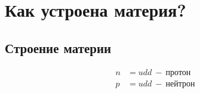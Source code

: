 \documentclass[a4paper,12pt]{report}
\begin{document}
    \tableofcontents
    \newpage

    \section{Как устроена материя?}
    \subsection{Строение материи}
        \begin{align*}
            n&=udd\  -\  \text{протон}\\
            p&=udd\  -\  \text{нейтрон}
        \end{align*}
        \begin{figure}
            \begin{table}
                
            \end{table}
        \end{figure}
\end{document}
